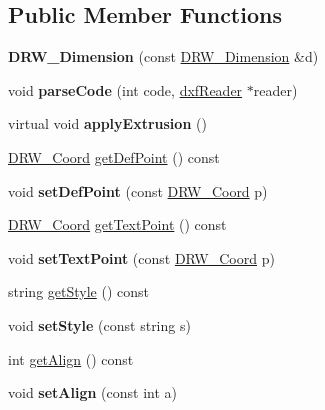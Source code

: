 \subsection*{Public Member Functions}
\begin{DoxyCompactItemize}
\item 
\hypertarget{classDRW__Dimension_aaa3d0aa12fc78b6f6dab9c1039040910}{{\bfseries D\-R\-W\-\_\-\-Dimension} (const \hyperlink{classDRW__Dimension}{D\-R\-W\-\_\-\-Dimension} \&d)}\label{classDRW__Dimension_aaa3d0aa12fc78b6f6dab9c1039040910}

\item 
\hypertarget{classDRW__Dimension_a65a475f25fc8178addf6313c677d0b71}{void {\bfseries parse\-Code} (int code, \hyperlink{classdxfReader}{dxf\-Reader} $\ast$reader)}\label{classDRW__Dimension_a65a475f25fc8178addf6313c677d0b71}

\item 
\hypertarget{classDRW__Dimension_a2a76f7b7a368bf5d447bed4fdcd565a4}{virtual void {\bfseries apply\-Extrusion} ()}\label{classDRW__Dimension_a2a76f7b7a368bf5d447bed4fdcd565a4}

\item 
\hyperlink{classDRW__Coord}{D\-R\-W\-\_\-\-Coord} \hyperlink{classDRW__Dimension_aff7c5b5035b520428c2a0c181f7cb102}{get\-Def\-Point} () const 
\item 
\hypertarget{classDRW__Dimension_aa9512e1d9b84d3c2331a7a08c9e64da8}{void {\bfseries set\-Def\-Point} (const \hyperlink{classDRW__Coord}{D\-R\-W\-\_\-\-Coord} p)}\label{classDRW__Dimension_aa9512e1d9b84d3c2331a7a08c9e64da8}

\item 
\hyperlink{classDRW__Coord}{D\-R\-W\-\_\-\-Coord} \hyperlink{classDRW__Dimension_aa7dcaa119dfc8aaacdf093067ac5a781}{get\-Text\-Point} () const 
\item 
\hypertarget{classDRW__Dimension_a6c3de2ac1fcba7ed202498314b8b4c79}{void {\bfseries set\-Text\-Point} (const \hyperlink{classDRW__Coord}{D\-R\-W\-\_\-\-Coord} p)}\label{classDRW__Dimension_a6c3de2ac1fcba7ed202498314b8b4c79}

\item 
string \hyperlink{classDRW__Dimension_a5f21c8705f59bfb2d51b7cb133acbc10}{get\-Style} () const 
\item 
\hypertarget{classDRW__Dimension_a13592943a7005ace74ea75b181a3d7ab}{void {\bfseries set\-Style} (const string s)}\label{classDRW__Dimension_a13592943a7005ace74ea75b181a3d7ab}

\item 
int \hyperlink{classDRW__Dimension_ac4423a75a6bf64525e096fe72938bfd7}{get\-Align} () const 
\item 
\hypertarget{classDRW__Dimension_ac2b64afa50f4f4616ec9ee45fa9d74ca}{void {\bfseries set\-Align} (const int a)}\label{classDRW__Dimension_ac2b64afa50f4f4616ec9ee45fa9d74ca}


\end{DoxyCompactItemize}
